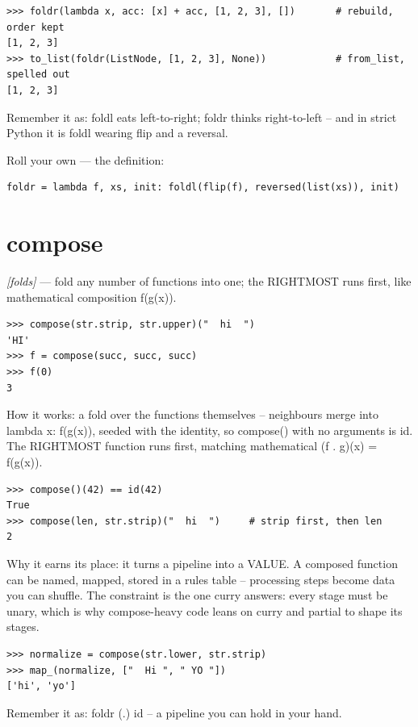 \documentclass[11pt,letterpaper]{book}
\begin{document}
\begin{lstlisting}[style=spec]
>>> foldr(lambda x, acc: [x] + acc, [1, 2, 3], [])       # rebuild, order kept
[1, 2, 3]
>>> to_list(foldr(ListNode, [1, 2, 3], None))            # from_list, spelled out
[1, 2, 3]
\end{lstlisting}

Remember it as: foldl eats left-to-right; foldr thinks right-to-left -- and in strict Python it is foldl wearing flip and a reversal.


Roll your own --- the definition:

\begin{lstlisting}[style=code]
foldr = lambda f, xs, init: foldl(flip(f), reversed(list(xs)), init)
\end{lstlisting}

\section{compose}
\noindent\textit{[folds]} --- fold any number of functions into one; the RIGHTMOST runs first, like mathematical composition f(g(x)).
\begin{lstlisting}[style=spec]
>>> compose(str.strip, str.upper)("  hi  ")
'HI'
>>> f = compose(succ, succ, succ)
>>> f(0)
3
\end{lstlisting}

How it works: a fold over the functions themselves -- neighbours merge into lambda x: f(g(x)), seeded with the identity, so compose() with no arguments is id. The RIGHTMOST function runs first, matching mathematical (f . g)(x) = f(g(x)).

\begin{lstlisting}[style=spec]
>>> compose()(42) == id(42)
True
>>> compose(len, str.strip)("  hi  ")     # strip first, then len
2
\end{lstlisting}

Why it earns its place: it turns a pipeline into a VALUE. A composed function can be named, mapped, stored in a rules table -- processing steps become data you can shuffle. The constraint is the one curry answers: every stage must be unary, which is why compose-heavy code leans on curry and partial to shape its stages.

\begin{lstlisting}[style=spec]
>>> normalize = compose(str.lower, str.strip)
>>> map_(normalize, ["  Hi ", " YO "])
['hi', 'yo']
\end{lstlisting}

Remember it as: foldr (.) id -- a pipeline you can hold in your hand.
\end{document}

